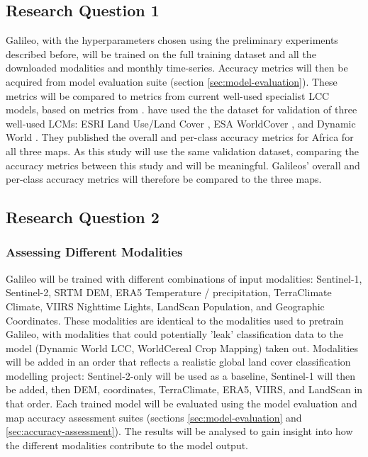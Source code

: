 \documentclass[a4paper,12pt]{article}
\begin{document}
\subsection{Research Question 1}
Galileo, with the hyperparameters chosen using the preliminary experiments described before, will be trained on the full training dataset and all the downloaded modalities and monthly time-series. Accuracy metrics will then be acquired from model evaluation suite (section \ref{sec:model-evaluation}). These metrics will be compared to metrics from current well-used specialist \ac{LCC} models, based on metrics from \citet{xuComparativeValidationRecent2024}. \citet{xuComparativeValidationRecent2024} have used the the \citet{tsendbazarOperationalValidationAnnual2021} dataset for validation of three well-used \ac{LCM}s: ESRI Land Use/Land Cover \citep{Karra2021GlobalLU}, ESA WorldCover \citep{zanagaESAWorldCover102022}, and Dynamic World \citep{brownDynamicWorldRealtime2022}. They published the overall and per-class accuracy metrics for Africa for all three maps. As this study will use the same validation dataset, comparing the accuracy metrics between this study and \citet{xuComparativeValidationRecent2024} will be meaningful. Galileos' overall and per-class accuracy metrics will therefore be compared to the three maps.

\subsection{Research Question 2}
\subsubsection{Assessing Different Modalities}
Galileo will be trained with different combinations of input modalities: Sentinel-1, Sentinel-2, SRTM \ac{DEM}, ERA5 Temperature / precipitation, TerraClimate Climate, VIIRS Nighttime Lights, LandScan Population, and Geographic Coordinates. These modalities are identical to the modalities used to pretrain Galileo, with modalities that could potentially 'leak' classification data to the model (Dynamic World LCC, WorldCereal Crop Mapping) taken out. Modalities will be added in an order that reflects a realistic global land cover classification modelling project: Sentinel-2-only will be used as a baseline, Sentinel-1 will then be added, then DEM, coordinates, TerraClimate, ERA5, VIIRS, and LandScan in that order. Each trained model will be evaluated using the model evaluation and map accuracy assessment suites (sections \ref{sec:model-evaluation} and \ref{sec:accuracy-assessment}). The results will be analysed to gain insight into how the different modalities contribute to the model output.
\end{document}
